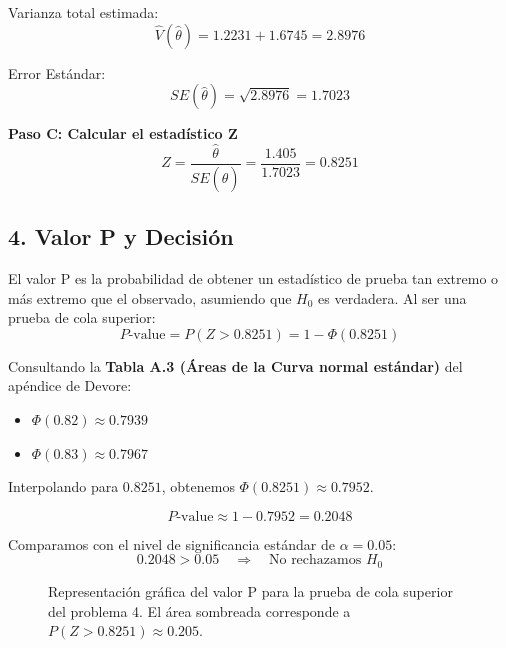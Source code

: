 \documentclass[12pt]{article}
\begin{document}
Varianza total estimada:
$$ \hat{V}(\hat{\theta}) = 1.2231 + 1.6745 = 2.8976 $$

Error Estándar:
$$ SE(\hat{\theta}) = \sqrt{2.8976} = 1.7023 $$

\textbf{Paso C: Calcular el estadístico Z}
$$ Z = \frac{\hat{\theta}}{SE(\hat{\theta})} = \frac{1.405}{1.7023} = 0.8251 $$


\subsection*{4. Valor P y Decisión}

El valor P es la probabilidad de obtener un estadístico de prueba tan extremo o más extremo que el observado, asumiendo que $H_0$ es verdadera. Al ser una prueba de cola superior:
$$ P\text{-value} = P(Z > 0.8251) = 1 - \Phi(0.8251) $$

Consultando la \textbf{Tabla A.3 (Áreas de la Curva normal estándar)} del apéndice de Devore:
\begin{itemize}
    \item $\Phi(0.82) \approx 0.7939$
    \item $\Phi(0.83) \approx 0.7967$
\end{itemize}

Interpolando para $0.8251$, obtenemos $\Phi(0.8251) \approx 0.7952$.

$$ P\text{-value} \approx 1 - 0.7952 = 0.2048 $$

Comparamos con el nivel de significancia estándar de $\alpha = 0.05$:
$$ 0.2048 > 0.05 \quad \Rightarrow \quad \text{No rechazamos } H_0 $$

\begin{figure}[H]
\centering
{}
\caption{Representación gráfica del valor P para la prueba de cola superior del problema 4. El área sombreada corresponde a $P(Z>0.8251) \approx 0.205$.}
\end{figure}
\end{document}
